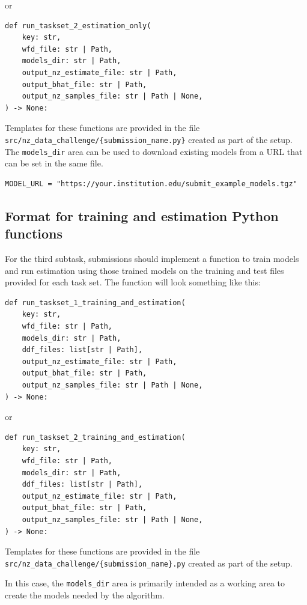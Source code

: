 \documentclass[11pt,twoside,letterpaper,onecolumn,english]{article}
\begin{document}
or

\begin{verbatim}
def run_taskset_2_estimation_only(
    key: str,
    wfd_file: str | Path,
    models_dir: str | Path,
    output_nz_estimate_file: str | Path,
    output_bhat_file: str | Path,
    output_nz_samples_file: str | Path | None,    
) -> None:
\end{verbatim}

Templates for these functions are provided in the file
\texttt{src/nz\_data\_challenge/\{submission\_name.py\}}
created as part of the setup.    The \texttt{models\_dir} area
can be used to download existing models from a URL that
can be set in the same file.

\begin{verbatim}
MODEL_URL = "https://your.institution.edu/submit_example_models.tgz"
\end{verbatim}


\subsection{Format for training and estimation Python functions}

For the third subtask, submissions should implement a function to
train models and run estimation using those trained models on the
training and test files provided for each task set. The function will
look something like this:

\begin{verbatim}
def run_taskset_1_training_and_estimation(
    key: str,
    wfd_file: str | Path,
    models_dir: str | Path,
    ddf_files: list[str | Path],
    output_nz_estimate_file: str | Path,
    output_bhat_file: str | Path,
    output_nz_samples_file: str | Path | None,     
) -> None:
\end{verbatim}

or

\begin{verbatim}
def run_taskset_2_training_and_estimation(
    key: str,
    wfd_file: str | Path,
    models_dir: str | Path,
    ddf_files: list[str | Path],
    output_nz_estimate_file: str | Path,
    output_bhat_file: str | Path,
    output_nz_samples_file: str | Path | None,     
) -> None:
\end{verbatim}

Templates for these functions are provided in the file
\texttt{src/nz\_data\_challenge/\{submission\_name\}.py}
created as part of the setup.

In this case, the \texttt{models\_dir} area is primarily intended
as a working area to create the models needed by the algorithm.
\end{document}
